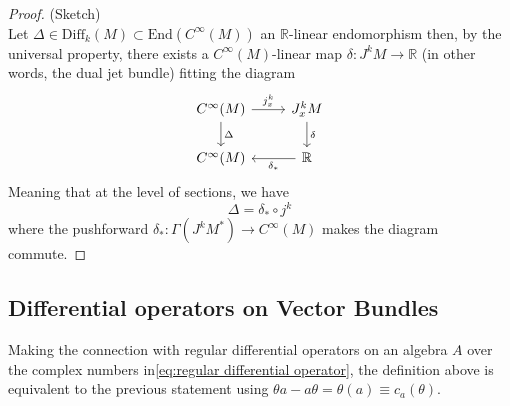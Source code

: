 \begin{proof}{(Sketch)\\}
    Let $\Delta \in \mathrm{Diff}_k(M) \subset \mathrm{End}(C^\infty(M))$ an $\mathbb{R}$-linear endomorphism then, by the universal property, there exists a $C^\infty(M)$-linear map $\delta : J^k M \rightarrow \mathbb{R}$ (in other words, the dual jet bundle) fitting the diagram
    \begin{equation}
        \begin{tikzcd}
            C^\infty(M) \arrow["j^k_x"]{r} \arrow["\Delta"]{d}& J^k_x M \arrow["\delta"]{d} \\
            C^\infty(M) & \mathbb{R} \arrow["\delta_*"]{l}
        \end{tikzcd}
    \end{equation}
    Meaning that at the level of sections, we have 
    \begin{equation}
        \Delta = \delta_* \circ j^k
    \end{equation}
    where the pushforward $\delta_*: \Gamma(J^k M ^*) \rightarrow C^\infty(M)$ makes the diagram commute.
\end{proof}
\subsection{Differential operators on Vector Bundles} %
\label{sub:differential_operators_on_vector_bundles}
% 
Making the connection with regular differential operators on an algebra $A$ over the complex numbers in\cref{eq:regular differential operator}, the definition above is equivalent to the previous statement using $\theta a - a \theta = \theta(a) \equiv c_a(\theta) $.

